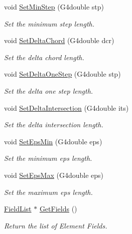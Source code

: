 \begin{DoxyCompactItemize}
void \hyperlink{classEMMAGlobalField_a74172566a3711b8a6195cb0c2d3dd913}{Set\+Min\+Step} (G4double stp)
\begin{DoxyCompactList}\small\item\em Set the minimum step length. \end{DoxyCompactList}\item 
void \hyperlink{classEMMAGlobalField_a722745942e02c644f2c77594dcd9be10}{Set\+Delta\+Chord} (G4double dcr)
\begin{DoxyCompactList}\small\item\em Set the delta chord length. \end{DoxyCompactList}\item 
void \hyperlink{classEMMAGlobalField_ab441674d282ecec31aca00ced9d39395}{Set\+Delta\+One\+Step} (G4double stp)
\begin{DoxyCompactList}\small\item\em Set the delta one step length. \end{DoxyCompactList}\item 
void \hyperlink{classEMMAGlobalField_ac5f63326e36ca8aee6e2b57489d1aebf}{Set\+Delta\+Intersection} (G4double its)
\begin{DoxyCompactList}\small\item\em Set the delta intersection length. \end{DoxyCompactList}\item 
void \hyperlink{classEMMAGlobalField_a9fe3615c5d73f4822e7d1a943bc8438c}{Set\+Eps\+Min} (G4double eps)
\begin{DoxyCompactList}\small\item\em Set the minimum eps length. \end{DoxyCompactList}\item 
void \hyperlink{classEMMAGlobalField_ad31573ebe91b18d3de81365ff5c02b0b}{Set\+Eps\+Max} (G4double eps)
\begin{DoxyCompactList}\small\item\em Set the maximum eps length. \end{DoxyCompactList}\item 
\hyperlink{EMMAGlobalField_8hh_a40431785b28c5a3bdd4df87d5f637c5b}{Field\+List} $\ast$ \hyperlink{classEMMAGlobalField_a44035b4b2d642ec3faa2719bc6ed6b06}{Get\+Fields} ()
\begin{DoxyCompactList}\small\item\em Return the list of Element Fields. \end{DoxyCompactList}\end{DoxyCompactItemize}

